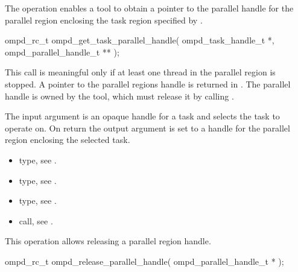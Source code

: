 \label{subsubsubsec:ompd_get_task_parallel_handle}
\summary
The    operation enables a tool to obtain a
pointer to the parallel handle for the parallel region enclosing the task region specified by
.

\format

\begin{cspecific}
\begin{ompSyntax}
ompd_rc_t ompd_get_task_parallel_handle(
  ompd_task_handle_t *,
  ompd_parallel_handle_t **
);
\end{ompSyntax}
\end{cspecific}


\descr
This call is meaningful only if at least one thread in the parallel region is stopped.
A pointer to the parallel regions handle is returned in .
The parallel handle is owned by the
tool, which must release it by calling .

\argdesc
The input argument  is an opaque handle for a task and selects the task to operate on.
On return the output argument  is set to a handle for the parallel region
enclosing the selected task.

\crossreferences
\begin{itemize}
  \item {} type, see .
	\item {} type, see .
	\item {} type, see .
	\item {} call, see .
\end{itemize}

\label{subsubsubsec:ompd_release_parallel_handle}
\summary
This operation allows releasing a parallel region handle.

\format

\begin{cspecific}
\begin{ompSyntax}
ompd_rc_t ompd_release_parallel_handle(
  ompd_parallel_handle_t *
);
\end{ompSyntax}
\end{cspecific}


